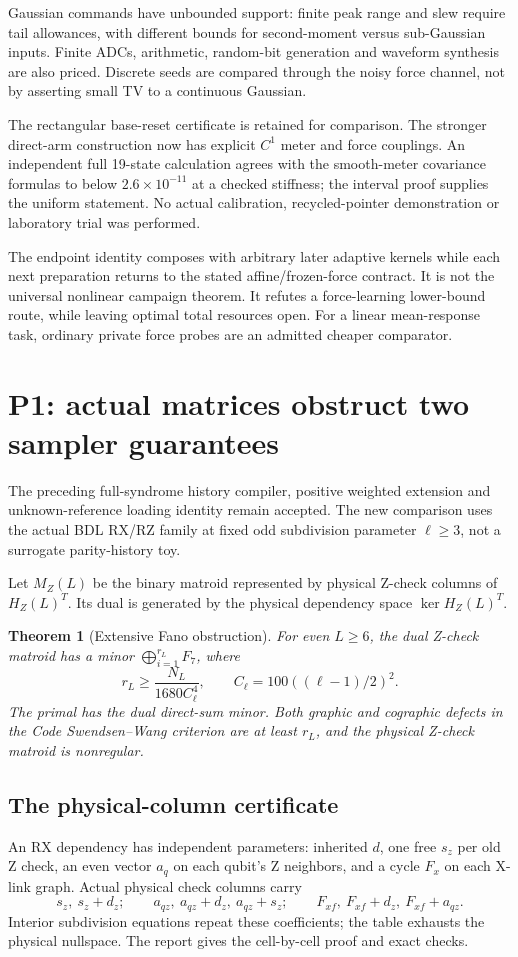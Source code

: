 \documentclass[11pt,a4paper]{article}
\newtheorem{theorem}{Theorem}\newtheorem{lemma}{Lemma}
\begin{document}
Gaussian commands have unbounded support: finite peak range and slew require tail allowances, with different bounds for second-moment versus sub-Gaussian inputs. Finite ADCs, arithmetic, random-bit generation and waveform synthesis are also priced. Discrete seeds are compared through the noisy force channel, not by asserting small TV to a continuous Gaussian.

The rectangular base-reset certificate is retained for comparison. The stronger direct-arm construction now has explicit $C^1$ meter and force couplings. An independent full 19-state calculation agrees with the smooth-meter covariance formulas to below $2.6\times10^{-11}$ at a checked stiffness; the interval proof supplies the uniform statement. No actual calibration, recycled-pointer demonstration or laboratory trial was performed.

The endpoint identity composes with arbitrary later adaptive kernels while each next preparation returns to the stated affine/frozen-force contract. It is not the universal nonlinear campaign theorem. It refutes a force-learning lower-bound route, while leaving optimal total resources open. For a linear mean-response task, ordinary private force probes are an admitted cheaper comparator.

\section{P1: actual matrices obstruct two sampler guarantees}
The preceding full-syndrome history compiler, positive weighted extension and unknown-reference loading identity remain accepted. The new comparison uses the actual BDL RX/RZ family at fixed odd subdivision parameter $\ell\ge3$, not a surrogate parity-history toy.\cite{bdl}

Let $M_Z(L)$ be the binary matroid represented by physical Z-check columns of $H_Z(L)^T$. Its dual is generated by the physical dependency space $\ker H_Z(L)^T$.
\begin{theorem}[Extensive Fano obstruction]
For even $L\ge6$, the dual Z-check matroid has a minor $\bigoplus_{i=1}^{r_L}F_7$, where
\[
 r_L\ge\frac{N_L}{1680C_\ell^4},\qquad
 C_\ell=100((\ell-1)/2)^2.
\]
The primal has the dual direct-sum minor. Both graphic and cographic defects in the Code Swendsen--Wang criterion are at least $r_L$, and the physical Z-check matroid is nonregular.
\end{theorem}

\subsection{The physical-column certificate}
An RX dependency has independent parameters: inherited $d$, one free $s_z$ per old Z check, an even vector $a_q$ on each qubit's Z neighbors, and a cycle $F_x$ on each X-link graph. Actual physical check columns carry
\[
 s_z,\ s_z+d_z;\qquad
 a_{qz},\ a_{qz}+d_z,\ a_{qz}+s_z;\qquad
 F_{xf},\ F_{xf}+d_z,\ F_{xf}+a_{qz}.
\]
Interior subdivision equations repeat these coefficients; the table exhausts the physical nullspace. The report gives the cell-by-cell proof and exact checks.
\end{document}
